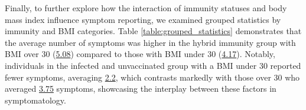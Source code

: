 \documentclass[11pt]{article}
\begin{document}
Finally, to further explore how the interaction of immunity statuses and body mass index influence symptom reporting, we examined grouped statistics by immunity and BMI categories. Table \ref{table:grouped_statistics} demonstrates that the average number of symptoms was higher in the hybrid immunity group with BMI over 30 (\hyperlink{C7b}{5.08}) compared to those with BMI under 30 (\hyperlink{C6c}{4.17}). Notably, individuals in the infected and unvaccinated group with a BMI under 30 reported fewer symptoms, averaging \hyperlink{C5b}{2.2}, which contrasts markedly with those over 30 who averaged \hyperlink{C1b}{3.75} symptoms, showcasing the interplay between these factors in symptomatology.

\begin{table}[h]
\caption{\protect\hyperlink{file-table-2-pkl}{Descriptive statistics of symptom number grouped by group and body mass index}}
\label{table:grouped_statistics}
\begin{threeparttable}
\renewcommand{\TPTminimum}{\linewidth}
\begin{tablenotes}
\footnotesize
\item 
\end{tablenotes}
\end{threeparttable}
\end{table}
\end{document}

